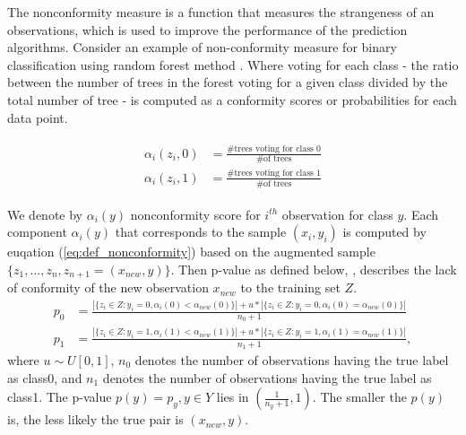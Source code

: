 \documentclass[main]{subfiles}
\begin{document}
The nonconformity measure is a function that measures the strangeness of an observations,
which is used to improve the performance of the prediction algorithms. Consider an example of non-conformity measure for binary classification
using  random forest method \cite{Breiman}. Where voting for each class - 
the ratio between the number of trees in the forest voting for a given class divided by
the total number of tree - is computed as a 
conformity scores or probabilities for each data point. 

\begin{align} \label{eq:def_nonconformity}
\begin{split}
\alpha_i(z_i, 0) &= \frac{\#\text{trees voting for class 0}}{\#\text{of trees}}\\
\alpha_i(z_i, 1) &= \frac{\#\text{trees voting for class 1}}{\#\text{of trees}}
\end{split}
\end{align}

We denote by $\alpha_i(y)$ nonconformity score for $i^{th}$ observation for class $y$. Each component  $\alpha_i(y)$ that corresponds to the sample $(x_i,y_i)$ is computed by
euqation (\ref{eq:def_nonconformity}) based on the augmented sample  $\{ z_1 , ..., z_n, z_{n+1}=(x_{new},y) \}$. Then p-value as defined below, \cite{vovk2005algorithmic},  describes the lack of conformity of the  new observation $x_{new}$ to the training set $Z$. 
 \begin{align*}
 p_0 &= \frac{| \{ z_i \in Z : y_i=0, \alpha_i(0) < \alpha_{new}(0) \} | + u* | \{ z_i \in Z : y_i=0, \alpha_i(0) = \alpha_{new}(0)\} |}{n_0+1} \\
 p_1 &= \frac{| \{ z_i \in Z :  y_i=1, \alpha_i(1) < \alpha_{new}(1) \}  |+u*|  \{ z_i \in Z :  y_i=1, \alpha_i(1) =\alpha_{new}(1) \} |}{n_1+1} ,
 \end{align*}
 where $u \sim U[0,1]$, $n_0$ denotes the number of observations having the true label as class0, and $n_1$ denotes the number of observations having the true label as class1.
The p-value $p(y)=p_y, y \in Y$ lies in $ \left( \frac{1}{n_y+1},1 \right)$. The smaller the $p(y)$
 is, the less likely the true pair is $(x_{new},y)$.
\end{document}
